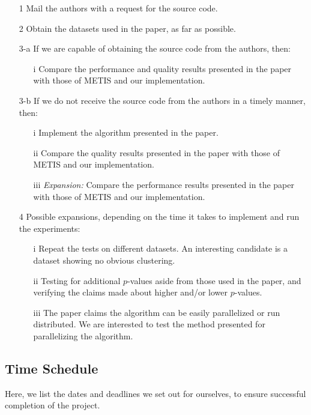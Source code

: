 \documentclass[a4paper]{article}
\begin{document}
\begin{enumerate}
\item[1] Mail the authors with a request for the source code. 
\item[2] Obtain the datasets used in the paper, as far as possible.
\item[3-a] If we are capable of obtaining the source code from the authors, then:
\begin{enumerate}
\item[i] Compare the performance and quality results presented in the paper with those of METIS and our implementation.
\end{enumerate}
\item[3-b] If we do not receive the source code from the authors in a timely manner, then:
\begin{enumerate}
\item[i] Implement the algorithm presented in the paper.
\item[ii] Compare the quality results presented in the paper with those of METIS and our implementation.
\item[iii] \textit{Expansion:} Compare the performance results presented in the paper with those of METIS and our implementation.
\end{enumerate}
\item[4] Possible expansions, depending on the time it takes to implement and run the experiments:
\begin{enumerate}
\item[i] Repeat the tests on different datasets. An interesting candidate is a dataset showing no obvious clustering. 
\item[ii] Testing for additional $p$-values aside from those used in the paper, and verifying the claims made about higher and/or lower $p$-values.
\item[iii] The paper claims the algorithm can be easily parallelized or run distributed. We are interested to test the method presented for parallelizing the algorithm.
\end{enumerate}
\end{enumerate}

\subsection{Time Schedule}
Here, we list the dates and deadlines we set out for ourselves, to ensure successful completion of the project.
\end{document}
